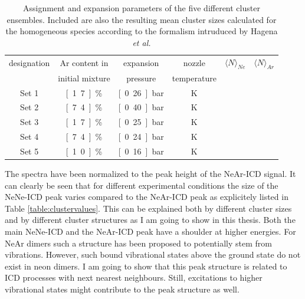 \begin{table}[!h]
 \centering
 \caption{Assignment and expansion parameters of the five different
          cluster ensembles. Included are also the resulting mean
          cluster sizes calculated for the homogeneous species according
          to the formalism intruduced by Hagena \it{et al.}
          \cite{Hagena72}}
  \begin{tabular}{c c c c c c}
          \toprule
           designation    &       Ar content in   & expansion & nozzle & $\langle N\rangle _{Ne}$ & $\langle N\rangle _{Ar}$ \\
                                          &       initial mixture &  pressure & temperature & &  \\
          \midrule
          Set 1   &       \unit[1.7]{\%}  &       \unit[0.26]{bar}        &       \unit[63]{K}    &       \unit[5]        &       \unit[520]      \\
          Set 2   &       \unit[7.4]{\%}  &       \unit[0.40]{bar}        &       \unit[60]{K}    &       \unit[17]       &       \unit[1850] \\
          Set 3   &       \unit[1.7]{\%}  &       \unit[0.25]{bar}        &       \unit[57]{K}    &       \unit[7]        &       \unit[810]  \\
          Set 4   &       \unit[7.4]{\%}  &       \unit[0.24]{bar}        &       \unit[58]{K}    &       \unit[6]        &       \unit[670]  \\
          Set 5   &       \unit[1.0]{\%}  &       \unit[0.16]{bar}        &       \unit[54]{K}    &       \unit[3]        &       \unit[380]  \\
          \bottomrule
  \end{tabular}
\label{table:expansion_conditions}
\end{table}

The spectra have been normalized to the peak height of the NeAr-ICD signal.
It can clearly be seen that for different experimental conditions the
size of the NeNe-ICD peak varies compared to the NeAr-ICD peak as explicitely
listed in Table \ref{table:clustervalues}. This can be
explained both by different cluster sizes and by different cluster structures
as I am going to show in this thesis. Both the main NeNe-ICD and the NeAr-ICD peak
have a shoulder at higher energies. For NeAr dimers such a structure has
been proposed to potentially stem from vibrations. However, such bound vibrational
states above the ground state do not exist in neon dimers. I am going to show
that this peak structure is related to \ac{ICD} processes with next nearest
neighbours. Still, excitations to higher vibrational states might contribute
to the peak structure as well.

